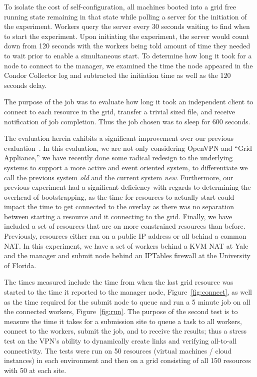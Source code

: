 \documentclass[twocolumn]{svjour3}
\begin{document}
To isolate the cost of self-configuration, all machines booted into a grid free
running state remaining in that state while polling a server for the initiation
of the experiment.  Workers query the server every 30 seconds waiting to find
when to start the experiment.  Upon initiating the experiment, the server would
count down from 120 seconds with the workers being told amount of time they
needed to wait prior to enable a simultaneous start.  To determine how long it
took for a node to connect to the manager, we examined the time the node
appeared in the Condor Collector log and subtracted the initiation time as well
as the 120 seconds delay.

The purpose of the job was to evaluate how long it took an independent client
to connect to each resource in the grid, transfer a trivial sized file, and
receive notification of job completion.  Thus the job chosen was to sleep for
600 seconds.

The evaluation herein exhibits a significant improvement over our previous
evaluation~\cite{hpdc11}.  In this evaluation, we are not only considering
OpenVPN and ``Grid Appliance,'' we have recently done some radical redesign to
the underlying systems to support a more active and event oriented system, to
differentiate we call the previous system {\em old} and the current system {\em
new}.  Furthermore, our previous experiment had a significant deficiency with
regards to determining the overhead of bootstrapping, as the time for resources
to actually start could impact the time to get connected to the overlay as
there was no separation between starting a resource and it connecting to the
grid.  Finally, we have included a set of resources that are on more
constrained resources than before.  Previously, resources either ran on a
public IP address or all behind a common NAT.  In this experiment, we have a
set of workers behind a KVM NAT at Yale and the manager and submit node behind
an IPTables firewall at the University of Florida.

The times measured include the time from when the last grid resource was
started to the time it reported to the manager node, Figure~\ref{fig:connect},
as well as the time required for the submit node to queue and run a 5 minute
job on all the connected workers, Figure~\ref{fig:run}.  The purpose of the
second test is to measure the time it takes for a submission site to queue a
task to all workers, connect to the workers, submit the job, and to receive the
results; thus a stress test on the VPN's ability to dynamically create links
and verifying all-to-all connectivity.  The tests were run on 50 resources
(virtual machines / cloud instances) in each environment and then on a grid
consisting of all 150 resources with 50 at each site.
\end{document}
